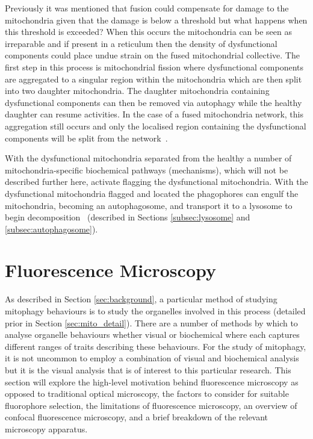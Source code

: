 Previously it was mentioned that fusion could compensate for damage to the mitochondria given that the damage is below a threshold but what happens when this threshold is exceeded? When this occurs the mitochondria can be seen as irreparable and if present in a reticulum then the density of dysfunctional components could place undue strain on the fused mitochondrial collective. The first step in this process is mitochondrial fission where dysfunctional components are aggregated to a singular region within the mitochondria which are then split into two daughter mitochondria. The daughter mitochondria containing dysfunctional components can then be removed via autophagy while the healthy daughter can resume activities. In the case of a fused mitochondria network, this aggregation still occurs and only the localised region containing the dysfunctional components will be split from the network~\cite{MitoFus-2012}.\par With the dysfunctional mitochondria separated from the healthy a number of mitochondria-specific biochemical pathways (mechanisms), which will not be described further here, activate flagging the dysfunctional mitochondria. With the dysfunctional mitochondria flagged and located the phagophores can engulf the mitochondria, becoming an autophagosome, and transport it to a lysosome to begin decomposition~\cite{MitoMechan, MitoFus-2012} (described in Sections \ref{subsec:lysosome} and \ref{subsec:autophagosome}).

\section{Fluorescence Microscopy} \label{sec:fluorMicr}
As described in Section \ref{sec:background}, a particular method of studying mitophagy behaviours is to study the organelles involved in this process (detailed prior in Section \ref{sec:mito_detail}). There are a number of methods by which to analyse organelle behaviours whether visual or biochemical where each captures different ranges of traits describing these behaviours. For the study of mitophagy, it is not uncommon to employ a combination of visual and biochemical analysis but it is the visual analysis that is of interest to this particular research. This section will explore the high-level motivation behind fluorescence microscopy as opposed to traditional optical microscopy, the factors to consider for suitable fluorophore selection, the limitations of fluorescence microscopy, an overview of confocal fluorescence microscopy, and a brief breakdown of the relevant microscopy apparatus.

